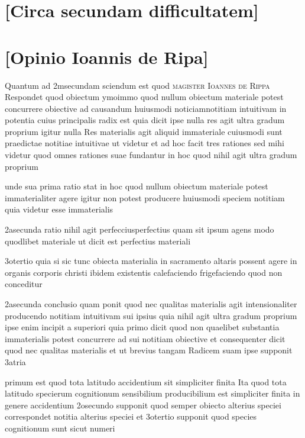 \documentclass[twoside, openright]{report}
\newcommand{\name}[1]{\textsc{#1}}
\begin{document}
        \bigskip
         \section*{[Circa secundam difficultatem]} 
        \bigskip
         \section*{[Opinio Ioannis de Ripa]} 
        \pstart
        Quantum ad 2msecundam sciendum est quod \name{magister Ioannes de Rippa} Respondet quod obiectum ymoimmo quod nullum obiectum materiale potest concurrere obiective ad causandum huiusmodi noticiamnotitiam intuitivam in potentia cuius principalis radix est quia dicit ipse nulla res agit ultra gradum proprium igitur nulla Res materialis agit aliquid immateriale cuiusmodi sunt praedictae notitiae intuitivae ut videtur et ad hoc facit tres rationes sed mihi videtur quod omnes rationes suae fundantur in hoc quod nihil agit ultra gradum proprium
        \pend
     
        \pstart
        unde sua prima ratio stat in hoc quod nullum obiectum materiale potest immaterialiter agere igitur non potest producere huiusmodi speciem notitiam quia videtur esse immaterialis
        \pend
     
        \pstart
        2asecunda ratio nihil agit perfecciusperfectius quam sit ipsum agens modo quodlibet materiale ut dicit est perfectius materiali
        \pend
     
        \pstart
        3otertio quia si sic tunc obiecta materialia in sacramento altaris possent agere in organis corporis christi ibidem existentis calefaciendo frigefaciendo quod non conceditur
        \pend
     
        \pstart
        2asecunda conclusio quam ponit quod nec qualitas materialis agit intensionaliter producendo notitiam intuitivam sui ipsius quia nihil agit ultra gradum proprium ipse enim incipit a superiori quia primo dicit quod non quaelibet substantia immaterialis potest concurrere ad sui notitiam obiective et consequenter dicit quod nec qualitas materialis et ut brevius tangam Radicem suam ipse supponit 3atria
        \pend
     
        \pstart
        primum est quod tota latitudo accidentium sit simpliciter finita Ita quod tota latitudo specierum cognitionum sensibilium producibilium est simpliciter finita in genere accidentium 2osecundo supponit quod semper obiecto alterius speciei correspondet notitia alterius speciei et 3otertio supponit quod species cognitionum sunt sicut numeri
        \pend
     
\end{document}
